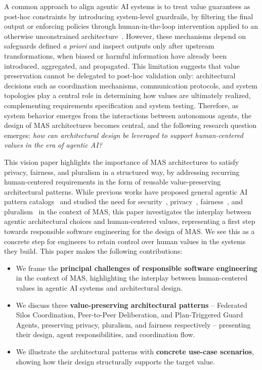 \documentclass[sigconf,nonacm]{acmart}
\begin{document}
A common approach to align agentic AI systems is to treat value guarantees as post-hoc constraints by introducing system-level guardrails, by filtering the final output or enforcing policies through human-in-the-loop intervention applied to an otherwise unconstrained architecture~\cite{kim2026attack,shamsujjoha2025swiss}.
However, these mechanisms depend on safeguards defined \textit{a priori} and inspect outputs only after upstream transformations, when biased or harmful information have already been introduced, aggregated, and propagated.
This limitation suggests that value preservation cannot be delegated to post-hoc validation only:
architectural decisions such as coordination mechanisms, communication protocols, and system topologies play a central role in determining how values are ultimately realized, complementing requirements specification and system testing.
Therefore, as system behavior emerges from the interactions between autonomous agents, the design of MAS architectures becomes central, and the following research question emerges: \textit{how can architectural design be leveraged to support human-centered values in the era of agentic AI?}

This vision paper highlights the importance of MAS architectures to satisfy privacy, fairness, and pluralism in a structured way, by addressing recurring human-centered requirements in the form of reusable value-preserving architectural patterns.
While previous works have proposed general agentic AI pattern catalogs~\cite{liu2025agent} and studied the need for security~\cite{raza2026trism}, privacy~\cite{li2025123,yagoubi2026agentleak}, fairness~\cite{borah2024implicit,aird2024dynamic}, and pluralism~\cite{ashkinaze2025plurals,feng2024modular} in the context of MAS, this paper investigates the interplay between agentic architectural choices and human-centered values, representing a first step towards responsible software engineering for the design of MAS.
We see this as a concrete step for engineers to retain control over human values in the systems they build.
This paper makes the following contributions:
\begin{itemize}
  \item[\textbf{1.}] We frame the \textbf{principal challenges of responsible software engineering} in the context of MAS, highlighting the interplay between human-centered values in agentic AI systems and architectural design.
  \item[\textbf{2.}] We discuss three \textbf{value-preserving architectural patterns} -- Federated Silos Coordination, Peer-to-Peer Deliberation, and Plan-Triggered Guard Agents, preserving privacy, pluralism, and fairness respectively -- presenting their design, agent responsibilities, and coordination flow.
  \item[\textbf{3.}] We illustrate the architectural patterns with \textbf{concrete use-case scenarios}, showing how their design structurally supports the target value.
\end{itemize}
\end{document}
